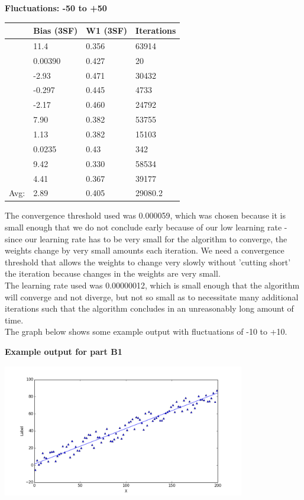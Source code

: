 \documentclass{article}
\begin{document}
\vspace{5mm}
\begin{center}
    \textbf{Fluctuations: -50 to +50}        \\
    \begin{tabular}{ r | l | l | l }
        \hline
        & Bias (3SF) & W1 (3SF) & Iterations \\
        \hline
        & 11.4       & 0.356    & 63914      \\
        & 0.00390    & 0.427    & 20         \\
        & -2.93      & 0.471    & 30432      \\
        & -0.297     & 0.445    & 4733       \\
        & -2.17      & 0.460    & 24792      \\
        & 7.90       & 0.382    & 53755      \\
        & 1.13       & 0.382    & 15103      \\
        & 0.0235     & 0.43     & 342        \\
        & 9.42       & 0.330    & 58534      \\
        & 4.41       & 0.367    & 39177      \\
        \hline
   Avg: & 2.89       & 0.405    & 29080.2    \\
        \hline
    \end{tabular}
\end{center}

\noindent The convergence threshold used was 0.000059, which was chosen because it is small enough that we do not conclude early because of our low learning rate - since our learning rate has to be very small for the algorithm to converge, the weights change by very small amounts each iteration. We need a convergence threshold that allows the weights to change very slowly without 'cutting short' the iteration because changes in the weights are very small. \\
\indent The learning rate used was 0.00000012, which is small enough that the algorithm will converge and not diverge, but not so small as to necessitate many additional iterations such that the algorithm concludes in an unreasonably long amount of time. \\
\indent The graph below shows some example output with fluctuations of -10 to +10.
\begin{center}
\textbf{Example output for part B1}\\
\centerline{\includegraphics[width=400px, height=220px]{partB1}}
\vspace{2mm}
\end{center}
\end{document}
